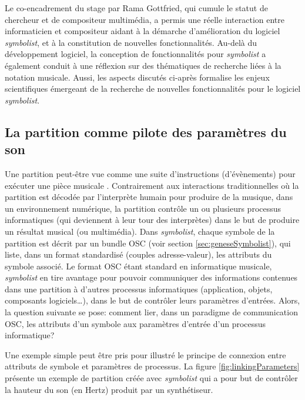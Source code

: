 Le co-encadrement du stage par Rama Gottfried, qui cumule le statut de chercheur et de compositeur multimédia, a permis une réelle interaction entre informaticien et compositeur aidant à la démarche d'amélioration du logiciel \textit{symbolist}, et à la constitution de nouvelles fonctionnalités. Au-delà du développement logiciel, la conception de fonctionnalités pour \textit{symbolist} a également conduit à une réflexion sur des thématiques de recherche liées à la notation musicale.
Aussi, les aspects discutés ci-après formalise les enjeux scientifiques émergeant de la recherche de nouvelles fonctionnalités pour le logiciel \textit{symbolist}.

\subsection{La partition comme pilote des paramètres du son} 
\label{subsec:partitionPiloteSon}
Une partition peut-être vue comme une suite d'instructions (d'évènements) pour exécuter une pièce musicale \cite{bosseur2005}. Contrairement aux interactions traditionnelles où la partition est décodée par l'interprète humain pour produire de la musique, dans un environnement numérique, la partition contrôle un ou plusieurs processus informatiques (qui deviennent à leur tour des interprètes) dans le but de produire un résultat musical (ou multimédia).
Dans \textit{symbolist}, chaque symbole de la partition est décrit par un bundle OSC (voir section \ref{sec:geneseSymbolist}), qui liste, dans un format standardisé (couples adresse-valeur), les attributs du symbole associé.
Le format OSC étant standard en informatique musicale, \textit{symbolist} en tire avantage pour pouvoir communiquer des informations contenues dans une partition à d'autres processus informatiques (application, objets, composants logiciels…), dans le but de contrôler leurs paramètres d'entrées.
Alors, la question suivante se pose: comment lier, dans un paradigme de communication OSC, les attributs d'un symbole aux paramètres d'entrée d'un processus informatique?

Une exemple simple peut être pris pour illustré le principe de connexion entre attributs de symbole et paramètres de processus. La figure \ref{fig:linkingParameters} présente un exemple de partition créée avec \textit{symbolist} qui a pour but de contrôler la hauteur du son (en Hertz) produit par un synthétiseur.

